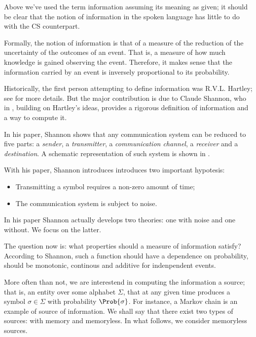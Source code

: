 \documentclass{subfiles}
\begin{document}
    Above we've used the term information assuming its meaning as given; 
        it should be clear that the notion of information in the spoken language
        has little to do with the CS counterpart. 

    Formally, the notion of information is that of a measure of the
        reduction of the uncertainty of the outcomes of an event. 
        That is, a measure of how much knowledge is gained observing the event. 
        Therefore, it makes sense that the information carried by an event is
        inversely proportional to its probability.

    Historically, the first person attempting to define information was R.V.L. Hartley;
        see \cite{hartley1928} for more details. But the major contribution is due to 
        Claude Shannon, who in \cite{shannon1948}, building on Hartley's ideas,
        provides a rigorous definition of information and a way to compute it.

    In his paper, Shannon shows that any communication system can be reduced to 
        five parts: a \emph{sender}, a \emph{transmitter}, a \emph{communication channel}, a \emph{receiver} and a \emph{destination}. 
        A schematic representation of such system is shown in .

    With his paper, Shannon introduces introduces two important hypotesis:
        \begin{itemize}
            \item Transmitting a symbol requires a non-zero amount of time;
            \item The communication system is subject to noise.
        \end{itemize}

        

    \begin{remark*}
        In his paper Shannon actually develops two theories: 
            one with noise and one without. We focus on the latter.
    \end{remark*}

    The question now is: what properties should a measure of information satisfy?
        According to Shannon, such a function should have a dependence on probability,
        should be monotonic, continous and additive for indenpendent events.

    More often than not, we are interestend in computing the information a source;
        that is, an entity over some alphabet \(\Sigma\),
        that at any given time produces a symbol \(\sigma \in \Sigma\)
        with probability \(\Prob{\sigma}\). 
        For instance, a Markov chain is an example of source of information.
        We shall say that there exist two types of sources: with memory and memoryless.
        In what follows, we consider memoryless sources.
\end{document}
